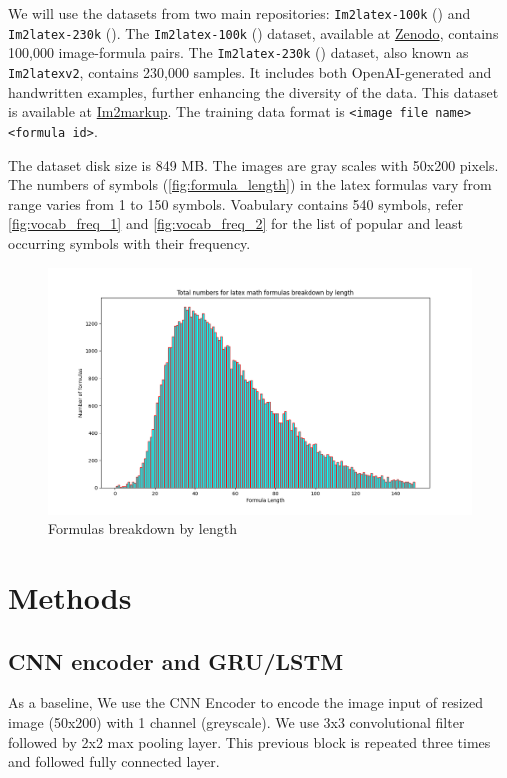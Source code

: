 \documentclass{article}
\begin{document}
We will use the datasets from two main repositories: \texttt{Im2latex-100k} (\cite{kanervisto_2016_56198}) and \texttt{Im2latex-230k} (\cite{gervais2024mathwritingdatasethandwrittenmathematical}). The \texttt{Im2latex-100k} (\cite{kanervisto_2016_56198}) dataset, available at \href{https://zenodo.org/records/11230382}{Zenodo}, contains 100,000 image-formula pairs. The \texttt{Im2latex-230k} (\cite{gervais2024mathwritingdatasethandwrittenmathematical}) 
 dataset, also known as \texttt{Im2latexv2}, contains 230,000 samples. It includes both OpenAI-generated and handwritten examples, further enhancing the diversity of the data. This dataset is available at \href{https://im2markup.yuntiandeng.com/data/}{Im2markup}. The training data format is \texttt{<image file name> <formula id>}.
 
 The dataset disk size is 849 MB. The images are gray scales with 50x200 pixels. The numbers of symbols (\autoref{fig:formula_length}) in the latex formulas vary from range varies from 1 to 150 symbols. Voabulary contains 540 symbols, refer \autoref{fig:vocab_freq_1} and \autoref{fig:vocab_freq_2} for the list of popular and least occurring symbols with their frequency.
 
\begin{figure}[H]
    \centering
    \includegraphics[scale=0.4]{fig_latex_formula_length.png}
    \caption{Formulas breakdown by length}
    \label{fig:formula_length}
\end{figure}

\section{Methods}

\subsection{CNN encoder and GRU/LSTM}
As a baseline, We use the CNN Encoder to encode the image input of resized image (50x200) with 1 channel (greyscale). We use 3x3 convolutional filter followed by 2x2 max pooling layer. This previous block is repeated three times and followed fully connected layer.
\end{document}
